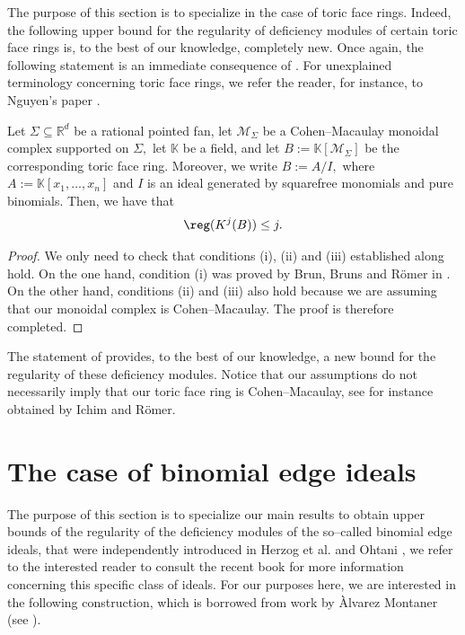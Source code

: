 \documentclass[11pt]{amsart}
\begin{document}
The purpose of this section is to specialize  in the case of toric face rings. Indeed, the following upper bound for the regularity of deficiency modules of certain toric face rings is, to the best of our knowledge, completely new. Once again, the following statement is an immediate consequence of . For unexplained terminology concerning toric face rings, we refer the reader, for instance, to Nguyen's paper \cite{HopNguyen2012}.

\begin{teo}
Let $\Sigma\subseteq\mathbb{R}^d$ be a rational pointed fan, let $\mathcal{M}_{\Sigma}$ be a Cohen--Macaulay monoidal complex supported on $\Sigma,$ let $\mathbb{K}$ be a field, and let $B:=\mathbb{K}[\mathcal{M}_{\Sigma}]$ be the corresponding toric face ring. Moreover, we write $B:=A/I,$ where $A:=\mathbb{K}[x_1,\ldots, x_n]$ and $I$ is an ideal generated by squarefree monomials and pure binomials. Then, we have that
\[
\reg(K^j(B))\leq j.
\]
\end{teo}

\begin{proof}
We only need to check that conditions (i), (ii) and (iii) established along  hold. On the one hand, condition (i) was proved by Brun, Bruns and R\"{o}mer in \cite[Proposition 2.2 and Proof]{BrunBrunsRomer2007}. On the other hand, conditions (ii) and (iii) also hold because we are assuming that our monoidal complex is Cohen--Macaulay. The proof is therefore completed.
\end{proof}

\begin{rk}
The statement of  provides, to the best of our knowledge, a new bound for the regularity of these deficiency modules. Notice that our assumptions do not necessarily imply that our toric face ring is Cohen--Macaulay, see for instance \cite[Theorem 1.1]{IchimRomer2007} obtained by Ichim and R\"{o}mer.
\end{rk}

\section{The case of binomial edge ideals}\label{section: the case of binomial edge ideals}
The purpose of this section is to specialize our main results to obtain upper bounds of the regularity of the deficiency modules of the so--called binomial edge ideals, that were independently introduced in Herzog et al. \cite{binomialedgeideals} and Ohtani \cite{Ohtanibinomialedgeideals}, we refer to the interested reader to consult the recent book \cite[Chapter 7]{HerzogHibiOhsugibinomialidealsbook} for more information concerning this specific class of ideals. For our purposes here, we are interested in the following construction, which is borrowed from work by \`Alvarez Montaner (see \cite[Definition 3.3]{AlvarezMontaner2020}).
\end{document}
